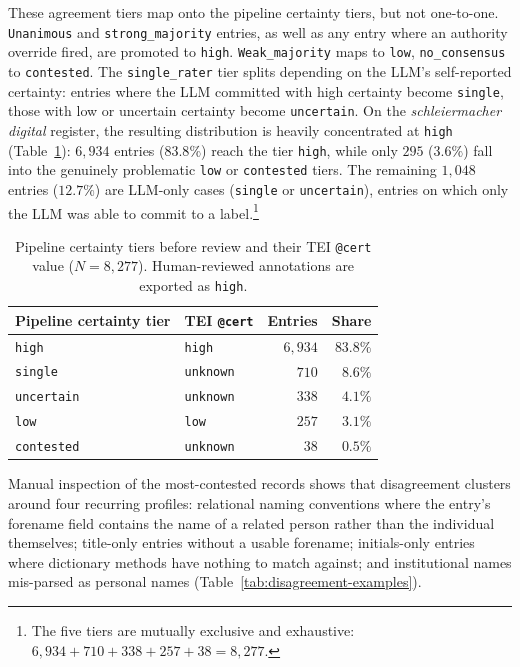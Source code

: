 \documentclass{eceasst}
\begin{document}
These agreement tiers map onto the pipeline certainty tiers, but not one-to-one. \texttt{Unanimous} and \texttt{strong\_majority} entries, as well as any entry where an authority override fired, are promoted to \texttt{high}. \texttt{Weak\_majority} maps to \texttt{low}, \texttt{no\_consensus} to \texttt{contested}. The \texttt{single\_rater} tier splits depending on the LLM's self-reported certainty: entries where the LLM committed with high certainty become \texttt{single}, those with low or uncertain certainty become \texttt{uncertain}. On the \textit{schleiermacher digital} register, the resulting distribution is heavily concentrated at \texttt{high} (Table~\ref{tab:cert-tiers}): $6{,}934$ entries ($83.8\%$) reach the tier \texttt{high}, while only $295$ ($3.6\%$) fall into the genuinely problematic \texttt{low} or \texttt{contested} tiers. The remaining $1{,}048$ entries ($12.7\%$) are LLM-only cases (\texttt{single} or \texttt{uncertain}), entries on which only the LLM was able to commit to a label.\footnote{The five tiers are mutually exclusive and exhaustive: $6{,}934 + 710 + 338 + 257 + 38 = 8{,}277$.}
\begin{table}
  \centering
\scriptsize
\setlength{\tabcolsep}{3pt}

  \begin{tabular}{llrr}
    \toprule
    Pipeline certainty tier & TEI \texttt{@cert} & Entries & Share \\
    \midrule
    \texttt{high}      & \texttt{high}    & $6{,}934$ & $83.8\%$ \\
    \texttt{single}    & \texttt{unknown} & $710$     & $8.6\%$  \\
    \texttt{uncertain} & \texttt{unknown} & $338$     & $4.1\%$  \\
    \texttt{low}       & \texttt{low}     & $257$     & $3.1\%$  \\
    \texttt{contested} & \texttt{unknown} & $38$      & $0.5\%$  \\
    \bottomrule
  \end{tabular}
  \caption{Pipeline certainty tiers before review and their TEI \texttt{@cert} value ($N = 8{,}277$). Human-reviewed annotations are exported as \texttt{high}.}
  \label{tab:cert-tiers}
\end{table}

Manual inspection of the most-contested records shows that disagreement clusters around four recurring profiles: relational naming conventions where the entry's forename field contains the name of a related person rather than the individual themselves; title-only entries without a usable forename; initials-only entries where dictionary methods have nothing to match against; and institutional names mis-parsed as personal names (Table~\ref{tab:disagreement-examples}).
\end{document}
